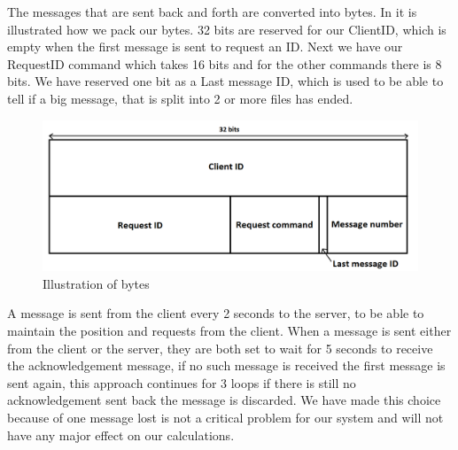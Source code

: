 The messages that are sent back and forth are converted into bytes. In
 it is illustrated how we pack our bytes. 32 bits are reserved for our ClientID, which is empty when the first message is sent to request an ID. Next we have our RequestID command which takes 16 bits and for the other commands there is 8 bits. We have reserved one bit as a Last message ID, which is used to be able to tell if a big message, that is split into 2 or more files has ended.

\begin{figure}[h!]
  \centering
    \includegraphics[width=1\textwidth]{figures/bytesclientserver.png}
    \caption{Illustration of bytes}
    \label{fig:bytesclientserver}
\end{figure}

A message is sent from the client every 2 seconds to the server, to be able to maintain the position and requests from the client.
When a message is sent either from the client or the server, they are both set to wait for 5 seconds to receive the acknowledgement message, if no such message is received the first message is sent again, this approach continues for 3 loops if there is still no acknowledgement sent back the message is discarded. We have made this choice because of one message lost is not a critical problem for our system and will not have any major effect on our calculations.		
